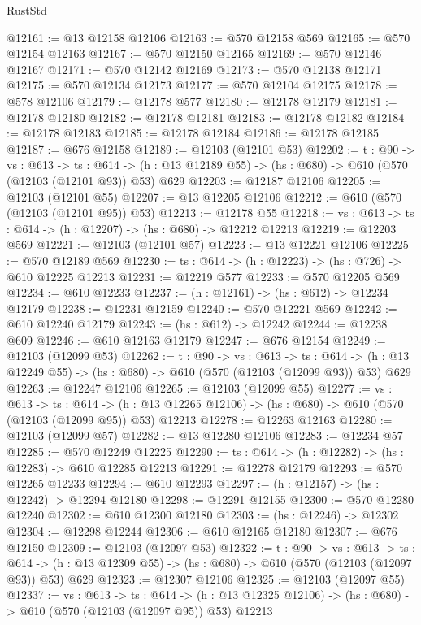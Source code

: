 \begin{lexlean}{RustStd}
\begin{coremodule}
@12161 := @13 @12158 @12106
@12163 := @570 @12158 @569
@12165 := @570 @12154 @12163
@12167 := @570 @12150 @12165
@12169 := @570 @12146 @12167
@12171 := @570 @12142 @12169
@12173 := @570 @12138 @12171
@12175 := @570 @12134 @12173
@12177 := @570 @12104 @12175
@12178 := @578 @12106
@12179 := @12178 @577
@12180 := @12178 @12179
@12181 := @12178 @12180
@12182 := @12178 @12181
@12183 := @12178 @12182
@12184 := @12178 @12183
@12185 := @12178 @12184
@12186 := @12178 @12185
@12187 := @676 @12158
@12189 := @12103 (@12101 @53)
@12202 := {t : @90} ->
  {vs : @613} ->
  {ts : @614} -> (h : @13 @12189 @55) -> (hs : @680) -> @610 (@570 (@12103 (@12101 @93)) @53) @629
@12203 := @12187 @12106
@12205 := @12103 (@12101 @55)
@12207 := @13 @12205 @12106
@12212 := @610 (@570 (@12103 (@12101 @95)) @53)
@12213 := @12178 @55
@12218 := {vs : @613} -> {ts : @614} -> (h : @12207) -> (hs : @680) -> @12212 @12213
@12219 := @12203 @569
@12221 := @12103 (@12101 @57)
@12223 := @13 @12221 @12106
@12225 := @570 @12189 @569
@12230 := {ts : @614} -> (h : @12223) -> (hs : @726) -> @610 @12225 @12213
@12231 := @12219 @577
@12233 := @570 @12205 @569
@12234 := @610 @12233
@12237 := (h : @12161) -> (hs : @612) -> @12234 @12179
@12238 := @12231 @12159
@12240 := @570 @12221 @569
@12242 := @610 @12240 @12179
@12243 := (hs : @612) -> @12242
@12244 := @12238 @609
@12246 := @610 @12163 @12179
@12247 := @676 @12154
@12249 := @12103 (@12099 @53)
@12262 := {t : @90} ->
  {vs : @613} ->
  {ts : @614} -> (h : @13 @12249 @55) -> (hs : @680) -> @610 (@570 (@12103 (@12099 @93)) @53) @629
@12263 := @12247 @12106
@12265 := @12103 (@12099 @55)
@12277 := {vs : @613} ->
  {ts : @614} ->
  (h : @13 @12265 @12106) -> (hs : @680) -> @610 (@570 (@12103 (@12099 @95)) @53) @12213
@12278 := @12263 @12163
@12280 := @12103 (@12099 @57)
@12282 := @13 @12280 @12106
@12283 := @12234 @57
@12285 := @570 @12249 @12225
@12290 := {ts : @614} -> (h : @12282) -> (hs : @12283) -> @610 @12285 @12213
@12291 := @12278 @12179
@12293 := @570 @12265 @12233
@12294 := @610 @12293
@12297 := (h : @12157) -> (hs : @12242) -> @12294 @12180
@12298 := @12291 @12155
@12300 := @570 @12280 @12240
@12302 := @610 @12300 @12180
@12303 := (hs : @12246) -> @12302
@12304 := @12298 @12244
@12306 := @610 @12165 @12180
@12307 := @676 @12150
@12309 := @12103 (@12097 @53)
@12322 := {t : @90} ->
  {vs : @613} ->
  {ts : @614} -> (h : @13 @12309 @55) -> (hs : @680) -> @610 (@570 (@12103 (@12097 @93)) @53) @629
@12323 := @12307 @12106
@12325 := @12103 (@12097 @55)
@12337 := {vs : @613} ->
  {ts : @614} ->
  (h : @13 @12325 @12106) -> (hs : @680) -> @610 (@570 (@12103 (@12097 @95)) @53) @12213

\end{coremodule}
\end{lexlean}
